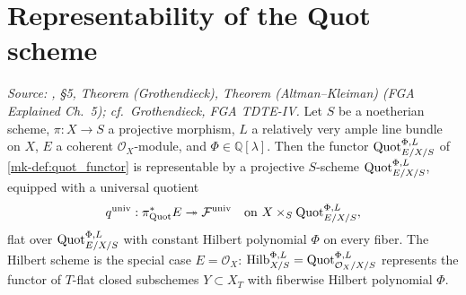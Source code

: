 \section{Representability of the Quot scheme}
\label{mk-sec:quot_representable}

\begin{theorem}\label{mk-thm:quot_representable}
  \leanok

  \textit{Source: \cite{nitsure-hilbert-quot}, \S 5, Theorem (Grothendieck), Theorem
  (Altman--Kleiman) (FGA Explained Ch.~5); cf.\ Grothendieck, FGA TDTE-IV.}
  Let \(S\) be a noetherian scheme, \(\pi : X \to S\) a projective morphism,
  \(L\) a relatively very ample line bundle on \(X\), \(E\) a coherent
  \(\mathcal{O}_X\)-module, and \(\Phi \in \mathbb{Q}[\lambda]\). Then the
  functor \(\operatorname{Quot}^{\Phi,L}_{E/X/S}\) of \ref{mk-def:quot_functor} is
  representable by a projective \(S\)-scheme \(\operatorname{Quot}^{\Phi,L}_{E/X/S}\),
  equipped with a universal quotient
  \[
    q^{\mathrm{univ}} :
    \pi^*_{\operatorname{Quot}} E \twoheadrightarrow \mathcal{F}^{\mathrm{univ}}
    \quad \text{on } X \times_S \operatorname{Quot}^{\Phi,L}_{E/X/S},
  \]
  flat over \(\operatorname{Quot}^{\Phi,L}_{E/X/S}\) with constant Hilbert polynomial
  \(\Phi\) on every fiber. The Hilbert scheme is the special case
  \(E = \mathcal{O}_X\): \(\operatorname{Hilb}^{\Phi,L}_{X/S} = \operatorname{Quot}^{\Phi,L}_{\mathcal{O}_X/X/S}\)
  represents the functor of \(T\)-flat closed subschemes
  \(Y \subset X_T\) with fiberwise Hilbert polynomial \(\Phi\).
\end{theorem}
